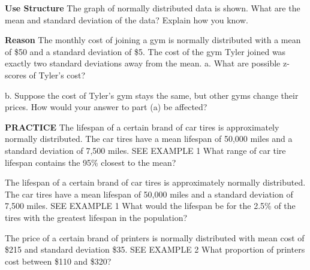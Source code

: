 \documentclass{article}
\newenvironment{practice}[2]{}{}        %
\newcommand{\answer}[1]{}               %
\newcommand{\placeholder}[2]{}          %
\newcommand{\te}[1]{}                   %
\begin{document}
\begin{practice}{11}{2}
\textbf{Use Structure} The graph of normally distributed data is shown. What are the mean and standard deviation of the data? Explain how you know.
\placeholder{graph}{Red normal bell curve with peak and solid vertical line at 46.5. Horizontal labels 21,29.5,38,46.5,55,63.5,72, vertical guides every 8.5. No vertical scale or arrows.}
\answer{The mean is the value at the peak on the graph, or 46.5. Subtract the value of one standard deviation above the mean, where the curvature of the graph changes, from the mean: (55-46.5=8.5). So, the standard deviation is 8.5.}
\te{Printed subtraction wording reverses the order in its displayed calculation.}
\end{practice}
\begin{practice}{12}{2}
\textbf{Reason} The monthly cost of joining a gym is normally distributed with a mean of \$50 and a standard deviation of \$5. The cost of the gym Tyler joined was exactly two standard deviations away from the mean.
a. What are possible z-scores of Tyler's cost?
\answer{a. −2 or 2}
b. Suppose the cost of Tyler's gym stays the same, but other gyms change their prices. How would your answer to part (a) be affected?
\answer{b. Answers may vary. Sample: If either the mean or standard deviation changes, the cost of Tyler's gym would have a different z-score. However, if both change, the cost of Tyler's gym may or may not have a different z-score.}
\end{practice}
\begin{practice}{13}{1}
\textbf{PRACTICE} The lifespan of a certain brand of car tires is approximately normally distributed. The car tires have a mean lifespan of 50,000 miles and a standard deviation of 7,500 miles. SEE EXAMPLE 1
What range of car tire lifespan contains the 95\% closest to the mean?
\answer{between 35,000 miles and 65,000 miles}
\end{practice}
\begin{practice}{14}{1}
The lifespan of a certain brand of car tires is approximately normally distributed. The car tires have a mean lifespan of 50,000 miles and a standard deviation of 7,500 miles. SEE EXAMPLE 1
What would the lifespan be for the 2.5\% of the tires with the greatest lifespan in the population?
\answer{greater than 65,000 miles}
\end{practice}
\begin{practice}{15}{1}
The price of a certain brand of printers is normally distributed with mean cost of \$215 and standard deviation \$35. SEE EXAMPLE 2
What proportion of printers cost between \$110 and \$320?
\answer{99.7\%}
\end{practice}
\end{document}
